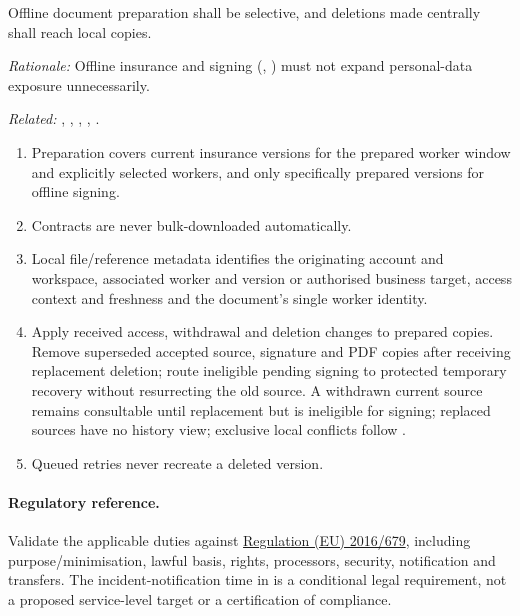 \label{nfr:PRV-07}
Offline document preparation shall be selective, and deletions made centrally shall reach local copies.

\textit{Rationale:} Offline insurance and signing (\hyperref[fr:039]{}, \hyperref[fr:045]{}) must not expand personal-data exposure unnecessarily.

\textit{Related:} \hyperref[fr:038]{}, \hyperref[fr:039]{}, \hyperref[fr:041]{}, \hyperref[fr:042]{}, \hyperref[fr:045]{}.
\begin{enumerate}[label=(\alph*),leftmargin=*,itemsep=1pt,topsep=3pt]
\item Preparation covers current insurance versions for the prepared worker window and explicitly selected workers, and only specifically prepared versions for offline signing.
\item Contracts are never bulk-downloaded automatically.
\item Local file/reference metadata identifies the originating account and workspace, associated worker and version or authorised business target, access context and freshness and the document's single worker identity.
\item Apply received access, withdrawal and deletion changes to prepared copies. Remove superseded accepted source, signature and PDF copies after receiving replacement deletion; route ineligible pending signing to protected temporary recovery without resurrecting the old source. A withdrawn current source remains consultable until replacement but is ineligible for signing; replaced sources have no history view; exclusive local conflicts follow .
\item Queued retries never recreate a deleted version.
\end{enumerate}

\paragraph{Regulatory reference.}
Validate the applicable duties against
\href{https://eur-lex.europa.eu/eli/reg/2016/679/oj}{Regulation (EU) 2016/679},
including purpose/minimisation, lawful basis, rights, processors, security,
notification and transfers. The incident-notification time in  is a conditional
legal requirement, not a proposed service-level target or a certification of compliance.
